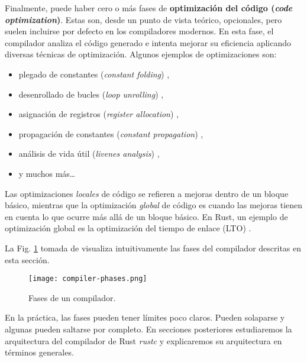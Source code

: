 Finalmente, puede haber cero o más fases de \textbf{optimización del código (\textit{code optimization})}.
Estas son, desde un punto de vista teórico, opcionales, pero suelen incluirse por defecto en los compiladores
modernos. En esta fase, el compilador analiza el código generado e intenta mejorar su
eficiencia aplicando diversas técnicas de optimización. Algunos ejemplos de optimizaciones
son:

\begin{itemize}
    \item plegado de constantes (\textit{constant folding}) \cite[Chap. 8.5.4]{aho2014compilers},
    \item desenrollado de bucles (\textit{loop unrolling}) \cite[Chap. 10.5]{aho2014compilers},
    \item asignación de registros (\textit{register allocation}) \cite[Chap. 8.1.4]{aho2014compilers},
    \item propagación de constantes (\textit{constant propagation}) \cite[Chap. 9]{aho2014compilers},
    \item análisis de vida útil (\textit{livenes analysis}) \cite[Chap. 9]{aho2014compilers},
    \item y muchos más\ldots
\end{itemize}

Las optimizaciones \emph{locales} de código se refieren a mejoras dentro de un bloque básico, mientras
que la optimización \emph{global} de código es cuando las mejoras tienen en cuenta
lo que ocurre más allá de un bloque básico.
En Rust, un ejemplo de optimización global es la optimización
del tiempo de enlace (\acrfull{LTO}) \cite{huss2020}.

La Fig. \ref{fig:compiler-phases} tomada de \cite{aho2014compilers} visualiza intuitivamente
las fases del compilador descritas en esta sección.

\begin{figure}[!htb]
    \centering
    \texttt{[image: compiler-phases.png]}
    \caption{Fases de un compilador.}
    \label{fig:compiler-phases}
\end{figure}

En la práctica, las fases pueden tener límites poco claros. Pueden solaparse y algunas pueden
saltarse por completo. En secciones posteriores estudiaremos la arquitectura del compilador de
Rust \emph{rustc} y explicaremos su arquitectura en términos generales.